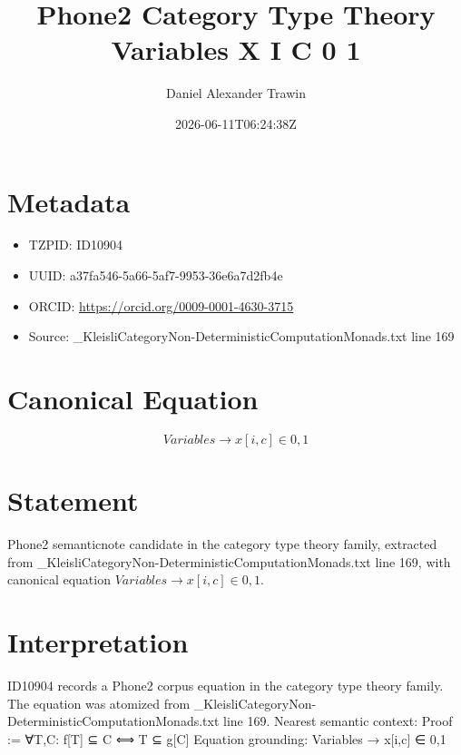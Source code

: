 \documentclass[11pt]{article}
\title{Phone2 Category Type Theory Variables X I C 0 1}
\author{Daniel Alexander Trawin}
\date{2026-06-11T06:24:38Z}
\begin{document}
\maketitle
\section*{Metadata}
\begin{itemize}
\item TZPID: ID10904
\item UUID: a37fa546-5a66-5af7-9953-36e6a7d2fb4e
\item ORCID: \url{https://orcid.org/0009-0001-4630-3715}
\item Source: _KleisliCategoryNon-DeterministicComputationMonads.txt line 169
\end{itemize}
\section*{Canonical Equation}
\[
Variables → x[i,c] ∈ {0,1}
\]
\section*{Statement}
Phone2 semanticnote candidate in the category type theory family, extracted from _KleisliCategoryNon-DeterministicComputationMonads.txt line 169, with canonical equation $Variables → x[i,c] ∈ {0,1}$.
\section*{Interpretation}
ID10904 records a Phone2 corpus equation in the category type theory family. The equation was atomized from _KleisliCategoryNon-DeterministicComputationMonads.txt line 169. Nearest semantic context: Proof := ∀T,C: f[T] ⊆ C ⟺ T ⊆ g[C] Equation grounding: Variables → x[i,c] ∈ {0,1}
\end{document}
